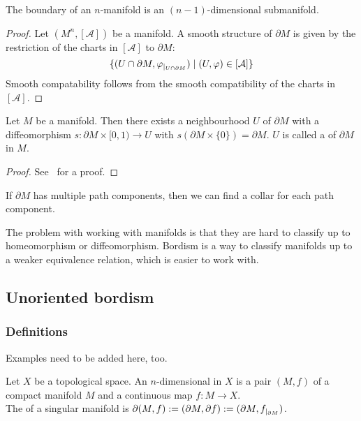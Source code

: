 \documentclass[a4paper,11pt]{article}
\begin{document}
\begin{theorem}
    The boundary of an \(n\)-manifold is an \((n-1)\)-dimensional submanifold.
\end{theorem}

\begin{proof}
    Let \((M^n,[\mathcal{A}])\) be a manifold. A smooth structure of \(\partial M\) is given by the restriction of the charts in \([\mathcal{A}]\) to \(\partial M\): \[\{(U\cap\partial M,\varphi_{|_{U\cap\partial M}})\mid (U,\varphi)\in[\mathcal{A}]\}\]
    Smooth compatability follows from the smooth compatibility of the charts in \([\mathcal{A}]\).
\end{proof}

\begin{theorem}
    Let \(M\) be a manifold. Then there exists a neighbourhood \(U\) of \(\partial M\) with a diffeomorphism \(s:\partial M\times [0,1)\to U\) with \(s(\partial M\times\{0\})=\partial M\). \(U\) is called a  of \(\partial M\) in \(M\).
\end{theorem}

\begin{proof}See\ \cite[p.223]{lee} for a proof.
\end{proof}

\begin{observation}
    If \(\partial M\) has multiple path components, then we can find a collar for each path component.
\end{observation}


The problem with working with manifolds is that they are hard to classify up to homeomorphism or diffeomorphism. Bordism is a way to classify manifolds up to a weaker equivalence relation, which is easier to work with.

\subsection{Unoriented bordism}
\subsubsection{Definitions}
Examples need to be added here, too.

\begin{definition}\label{singular manifold}
    Let \(X\) be a topological space. An \(n\)-dimensional  in \(X\) is a pair \((M,f)\) of a compact manifold \(M\) and a continuous map \(f:M\to X\).\\
    The  of a singular manifold is \(\partial(M,f):=(\partial M, \partial f):=(\partial M,f_{|_{\partial M}})\).
\end{definition}
\end{document}
